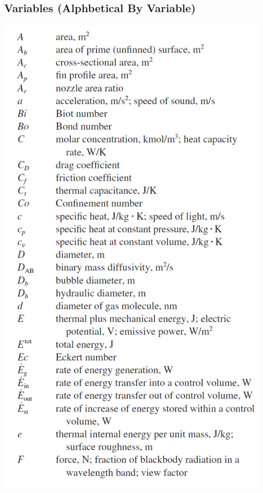 \documentclass[10pt,landscape]{article}
\newenvironment{Figure}
     {\par\medskip\noindent\minipage{\linewidth}}
     {\endminipage\par\medskip}
\begin{document}
\begin{multicols}{3}
\subsection{Variables (Alphbetical By Variable)}\begin{Figure}
    \centering
    \includegraphics[width=\linewidth]{Symbols_1.png}
\end{Figure}
\begin{Figure}
    \centering

\end{Figure}
\end{multicols}
\end{document}
